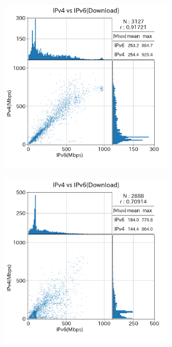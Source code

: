 \begin{figure}[htbp]
    \begin{center}
        \begin{minipage}[t]{0.48\textwidth}
            \begin{subfigure}[b]{\textwidth}
                \centering
                \includegraphics[width=0.8\textwidth]{fig/old_IPv4aaS_dl.png}
                \label{old_IPv4aaS_dl}
            \end{subfigure}
            \begin{subfigure}[b]{\textwidth}
                \centering
                \includegraphics[width=0.8\textwidth]{fig/old_mix_dl.png}

\end{subfigure}
\end{minipage}
\end{center}
\end{figure}
